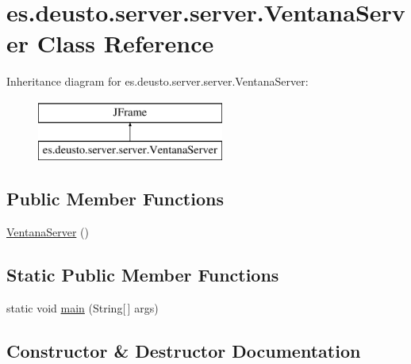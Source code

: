 \hypertarget{classes_1_1deusto_1_1server_1_1server_1_1_ventana_server}{}\section{es.\+deusto.\+server.\+server.\+Ventana\+Server Class Reference}
\label{classes_1_1deusto_1_1server_1_1server_1_1_ventana_server}
Inheritance diagram for es.\+deusto.\+server.\+server.\+Ventana\+Server\+:\begin{figure}[H]
\begin{center}
\leavevmode
\includegraphics[height=2.000000cm]{classes_1_1deusto_1_1server_1_1server_1_1_ventana_server}
\end{center}
\end{figure}
\subsection*{Public Member Functions}
\begin{DoxyCompactItemize}
\item 
\mbox{\hyperlink{classes_1_1deusto_1_1server_1_1server_1_1_ventana_server_a51bc7b8d820c4bbc17afb1f88283da9a}{Ventana\+Server}} ()
\end{DoxyCompactItemize}
\subsection*{Static Public Member Functions}
\begin{DoxyCompactItemize}
\item 
static void \mbox{\hyperlink{classes_1_1deusto_1_1server_1_1server_1_1_ventana_server_ab7df8e019ee3a79b0adaab0dd6bb0cd7}{main}} (String\mbox{[}$\,$\mbox{]} args)
\end{DoxyCompactItemize}


\subsection{Constructor \& Destructor Documentation}
\mbox{\label{classes_1_1deusto_1_1server_1_1server_1_1_ventana_server_a51bc7b8d820c4bbc17afb1f88283da9a}} 

